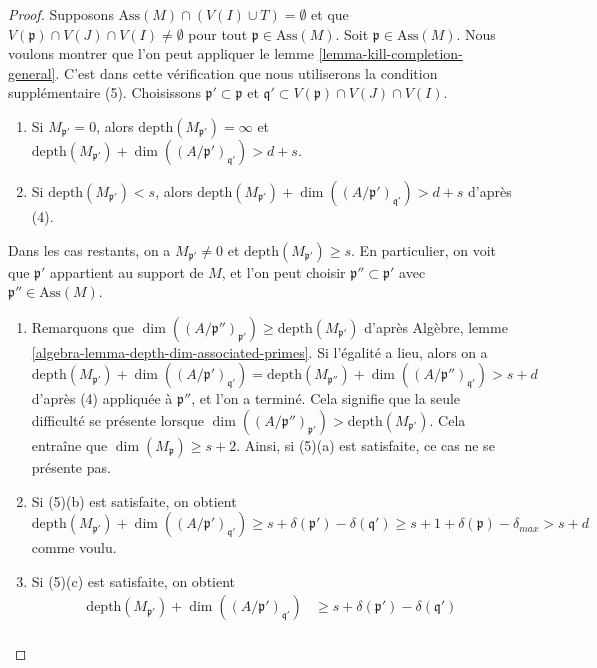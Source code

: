 \begin{proof}
\medskip\noindent
Supposons $\text{Ass}(M) \cap (V(I) \cup T) = \emptyset$ et que
$V(\mathfrak p) \cap V(J) \cap V(I) \not = \emptyset$
pour tout $\mathfrak p \in \text{Ass}(M)$.
Soit $\mathfrak p \in \text{Ass}(M)$. Nous voulons montrer que l'on peut appliquer le
lemme \ref{lemma-kill-completion-general}.
C'est dans cette vérification que nous utiliserons la condition supplémentaire
(5). Choisissons $\mathfrak p' \subset \mathfrak p$
et $\mathfrak q' \subset V(\mathfrak p) \cap V(J) \cap V(I)$.
\begin{enumerate}
\item Si $M_{\mathfrak p'} = 0$, alors
$\text{depth}(M_{\mathfrak p'}) = \infty$ et
$\text{depth}(M_{\mathfrak p'}) +
\dim((A/\mathfrak p')_{\mathfrak q'}) > d + s$.
\item Si $\text{depth}(M_{\mathfrak p'}) < s$, alors
$\text{depth}(M_{\mathfrak p'}) +
\dim((A/\mathfrak p')_{\mathfrak q'}) > d + s$ d'après (4).
\end{enumerate}
Dans les cas restants, on a $M_{\mathfrak p'} \not = 0$ et
$\text{depth}(M_{\mathfrak p'}) \geq s$. En particulier, on voit que
$\mathfrak p'$ appartient au support de $M$, et l'on peut choisir
$\mathfrak p'' \subset \mathfrak p'$ avec $\mathfrak p'' \in \text{Ass}(M)$.
\begin{enumerate}
\item[(a)] Remarquons que
$\dim((A/\mathfrak p'')_{\mathfrak p'}) \geq \text{depth}(M_{\mathfrak p'})$
d'après Algèbre, lemme \ref{algebra-lemma-depth-dim-associated-primes}.
Si l'égalité a lieu, alors on a
$$
\text{depth}(M_{\mathfrak p'}) + \dim((A/\mathfrak p')_{\mathfrak q'}) =
\text{depth}(M_{\mathfrak p''}) + \dim((A/\mathfrak p'')_{\mathfrak q'})
> s + d
$$
d'après (4) appliquée à $\mathfrak p''$, et l'on a terminé. Cela signifie que la
seule difficulté se présente lorsque
$\dim((A/\mathfrak p'')_{\mathfrak p'}) > \text{depth}(M_{\mathfrak p'})$.
Cela entraîne que $\dim(M_\mathfrak p) \geq s + 2$.
Ainsi, si (5)(a) est satisfaite, ce cas ne se présente pas.
\item[(b)] Si (5)(b) est satisfaite, on obtient
$$
\text{depth}(M_{\mathfrak p'}) + \dim((A/\mathfrak p')_{\mathfrak q'})
\geq s + \delta(\mathfrak p') - \delta(\mathfrak q')
\geq s + 1 + \delta(\mathfrak p) - \delta_{max}
> s + d
$$
comme voulu.
\item[(c)] Si (5)(c) est satisfaite, on obtient
\begin{align*}
\text{depth}(M_{\mathfrak p'}) + \dim((A/\mathfrak p')_{\mathfrak q'})
& \geq
s + \delta(\mathfrak p') - \delta(\mathfrak q') \\

\end{align*}
\end{enumerate}
\end{proof}
